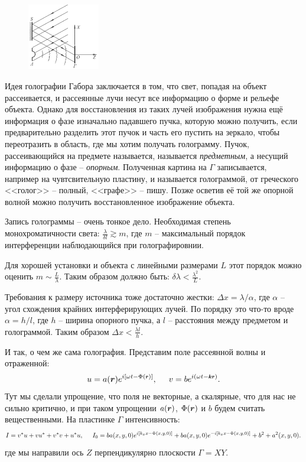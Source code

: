\begin{figure}
  \begin{center}
    \includegraphics[width=0.28\textwidth]{figures/s54_1.png}
  \end{center}
\end{figure}
Идея голографии Габора заключается в том, что свет, попадая на объект рассеивается, и рассеянные лучи несут все информацию о форме и рельефе объекта. Однако для восстановления из таких лучей изображения нужна ещё информация о фазе изначально падавшего пучка, которую можно получить, если предварительно разделить этот пучок и часть его пустить на зеркало, чтобы переотразить в область, где мы хотим получать голограмму.
Пучок, рассеивающийся на предмете называется, называется \textit{предметным}, а несущий информацию о фазе -- \textit{опорным}.
Полученная картина на $\Gamma$ записывается, например на чувтсвительную пластину,  и называется голограммой, от греческого <<голог>> -- полный, <<графе>> -- пишу. Позже осветив её той же опорной волной можно получить восстановленное изображение объекта.

Запись голограммы -- очень тонкое дело. Необходимая степень монохроматичности света:
	$\boxed{\frac{\lambda}{\delta l} \gtrsim m}$,
	где $m$ -- максимальный порядок интерференции наблюдающийся при голографировнии.

Для хорошей установки и объекта с линейными размерами $L $ этот порядок можно оценить $\boxed{m \sim \frac{L}{\lambda}}$.
Таким образом должно быть: $\boxed{\delta\lambda < \frac{\lambda^2}{L}}$.

Требования к размеру источника тоже достаточно жестки: $\Delta x = \lambda/\alpha$, где $\alpha$ -- угол схождения крайних интерферирующих лучей. По порядку это что-то вроде $\alpha = h/l$, где $h$ -- ширина опорного пучка, а $l$ -- расстояния между предметом и голограммой. Таким образом $\boxed{\Delta x < \frac{\lambda l}{h}}$.

И так, о чем же сама голография. Представим поле рассеянной волны и отраженной:
\begin{equation*}
	u = a (\vc{r}) e^{i [\omega t - \Phi(\smallvc{r})]},
	\hspace{0.5 cm}
	v = b e^{i (\omega t - \smallvc{k} \smallvc{r})}.
\end{equation*}
Тут мы сделали упрощение, что поля не векторные, а скалярные, что для нас не сильно критично, и при таком упрощении $a(\mbox{\boldmath $r$})$, $\Phi(\mbox{\boldmath $r$})$ и $b$ будем считать вещественными. На пластинке $\Gamma$ интенсивность:
\begin{equation*}
	I  = v^* u + v u^* + v^* v + u^* u,
	\hspace{0.5 cm}
	I_0 = b a (x,y,0) e^{i[k_x x - \Phi(x,y,0)]} + b a (x,y,0) e^{-i[k_x x - \Phi(x,y,0)]} + b^2 + a^2(x,y,0).
\end{equation*}
где мы направили ось $Z$ перпендикулярно плоскости $\Gamma = XY$.

